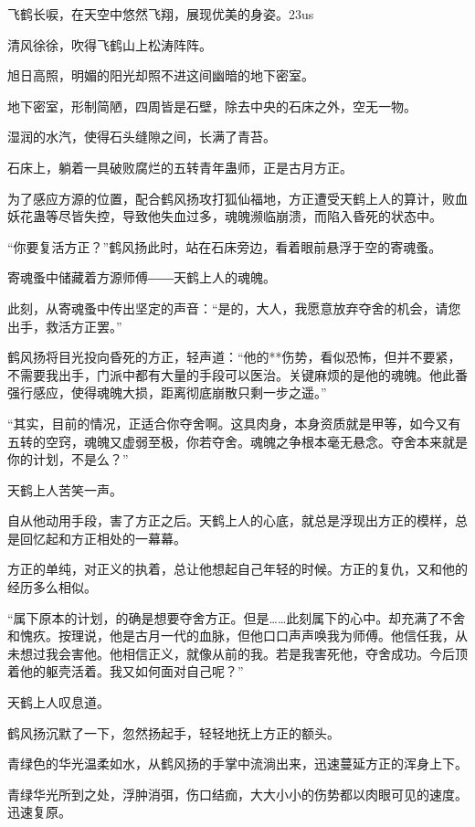 
\begin{this_body}

飞鹤长唳，在天空中悠然飞翔，展现优美的身姿。23us

清风徐徐，吹得飞鹤山上松涛阵阵。

旭日高照，明媚的阳光却照不进这间幽暗的地下密室。

地下密室，形制简陋，四周皆是石壁，除去中央的石床之外，空无一物。

湿润的水汽，使得石头缝隙之间，长满了青苔。

石床上，躺着一具破败腐烂的五转青年蛊师，正是古月方正。

为了感应方源的位置，配合鹤风扬攻打狐仙福地，方正遭受天鹤上人的算计，败血妖花蛊等尽皆失控，导致他失血过多，魂魄濒临崩溃，而陷入昏死的状态中。

“你要复活方正？”鹤风扬此时，站在石床旁边，看着眼前悬浮于空的寄魂蚤。

寄魂蚤中储藏着方源师傅――天鹤上人的魂魄。

此刻，从寄魂蚤中传出坚定的声音：“是的，大人，我愿意放弃夺舍的机会，请您出手，救活方正罢。”

鹤风扬将目光投向昏死的方正，轻声道：“他的**伤势，看似恐怖，但并不要紧，不需要我出手，门派中都有大量的手段可以医治。关键麻烦的是他的魂魄。他此番强行感应，使得魂魄大损，距离彻底崩散只剩一步之遥。”

“其实，目前的情况，正适合你夺舍啊。这具肉身，本身资质就是甲等，如今又有五转的空窍，魂魄又虚弱至极，你若夺舍。魂魄之争根本毫无悬念。夺舍本来就是你的计划，不是么？”

天鹤上人苦笑一声。

自从他动用手段，害了方正之后。天鹤上人的心底，就总是浮现出方正的模样，总是回忆起和方正相处的一幕幕。

方正的单纯，对正义的执着，总让他想起自己年轻的时候。方正的复仇，又和他的经历多么相似。

“属下原本的计划，的确是想要夺舍方正。但是……此刻属下的心中。却充满了不舍和愧疚。按理说，他是古月一代的血脉，但他口口声声唤我为师傅。他信任我，从未想过我会害他。他相信正义，就像从前的我。若是我害死他，夺舍成功。今后顶着他的躯壳活着。我又如何面对自己呢？”

天鹤上人叹息道。

鹤风扬沉默了一下，忽然扬起手，轻轻地抚上方正的额头。

青绿色的华光温柔如水，从鹤风扬的手掌中流淌出来，迅速蔓延方正的浑身上下。

青绿华光所到之处，浮肿消弭，伤口结痂，大大小小的伤势都以肉眼可见的速度。迅速复原。


\end{this_body}
